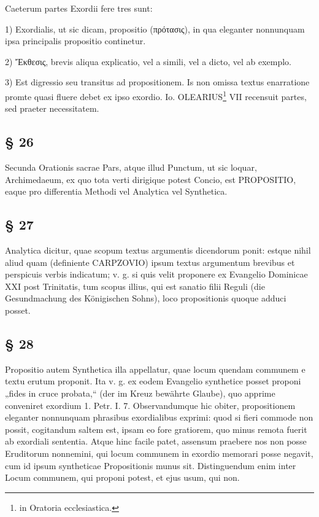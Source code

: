 Caeterum partes Exordii fere tres sunt:

1) Exordialis, ut sic dicam, propositio (πρότασις), in qua eleganter nonnunquam ipsa principalis propositio continetur.

2) Ἔκθεσις, brevis aliqua explicatio, vel a simili, vel a dicto, vel ab exemplo.

3) Est digressio seu transitus ad propositionem. Is non omissa textus enarratione promte quasi fluere
debet ex ipso exordio. Io. OLEARIUS\footnote{in Oratoria ecclesiastica.} VII recensuit partes, sed praeter necessitatem.

\subsection{§ 26}

Secunda Orationis sacrae Pars, atque illud Punctum, ut sic loquar, Archimedaeum, ex quo tota verti dirigique potest Concio, est PROPOSITIO, eaque pro differentia Methodi vel Analytica vel Synthetica.

\subsection{§ 27}

Analytica dicitur, quae scopum textus argumentis dicendorum ponit: estque nihil aliud quam (definiente CARPZOVIO) ipsum textus argumentum brevibus et perspicuis verbis indicatum; v. g. si quis velit proponere ex Evangelio Dominicae XXI post Trinitatis, tum scopus illius, qui est sanatio filii Reguli (die Gesundmachung des Königischen Sohns), loco propositionis quoque adduci posset.

\subsection{§ 28}

Propositio autem Synthetica illa appellatur, quae locum quendam communem e textu erutum proponit. Ita v. g. ex eodem Evangelio synthetice posset proponi „fides in cruce probata,“ (der im Kreuz bewährte Glaube), quo apprime conveniret exordium 1. Petr. I. 7. Observandumque hic obiter, propositionem eleganter nonnunquam phrasibus exordialibus exprimi: quod si fieri commode non possit, cogitandum saltem est, ipsam eo fore gratiorem, quo minus remota fuerit ab exordiali sententia. Atque hinc facile patet, assensum praebere nos non posse Eruditorum nonnemini, qui locum communem in exordio memorari posse negavit, cum id ipsum
syntheticae Propositionis munus sit. Distinguendum enim inter Locum communem, qui proponi potest, et ejus usum, qui non.

